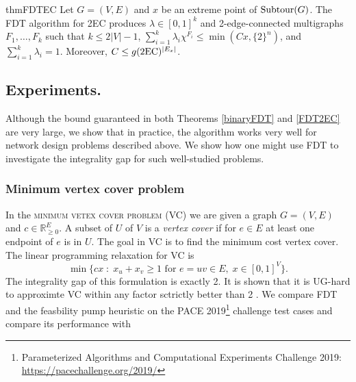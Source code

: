 \begin{restatable}{thm}{FDTEC}
	\label{FDT2EC}
	Let $G=(V,E)$ and $x$ be an extreme point of  $\operatorname{{Subtour}}(G)$. The FDT algorithm for 2EC produces $\lambda\in [0,1]^k$ and 2-edge-connected multigraphs $F_1,\ldots,F_k$ such that $k\leq 2|V|-1$, $\sum_{i=1}^{k}\lambda_i \chi^{F_i}\leq \min(Cx,\{2\}^n)$, and $\sum_{i=1}^{k}\lambda_i = 1$. Moreover, $C\leq g(\2ec)^{|E_x|}$.
\end{restatable}

\subsection{Experiments.} Although the bound guaranteed in both Theorems \ref{binaryFDT} and \ref{FDT2EC} are very large, we show that in practice, the algorithm works very well for network design problems described above. We show how one might use FDT to investigate the integrality gap for such well-studied problems. 


\subsubsection{Minimum vertex cover problem}

In the \textsc{minimum vetex cover problem (VC)} we are given a graph $G=(V,E)$ and $c\in \mathbb{R}^E_{\geq 0}$. A subset of $U$ of $V$ is a \textit{vertex cover} if for $e\in E$ at least one endpoint of $e$ is in $U$. The goal in VC is to find the minimum cost vertex cover. The linear programming relaxation for VC is
\begin{equation}
\min \{cx \; : \; x_u + x_v \geq	 1 \text{ for } e=uv \in E, \; x\in [0,1]^{V}\}.
\end{equation}
The integrality gap of this formulation is exactly 2.  It is shown that it is UG-hard to approximte VC within any factor sctrictly better than 2 \cite{UGhardVC}.  We compare  FDT and the feasbility pump heuristic \cite{fp1} on the PACE 2019\footnote{ Parameterized Algorithms and Computational Experiments Challenge 2019: \url{https://pacechallenge.org/2019/}} challenge test cases \cite{PACE} and compare its performance with 
